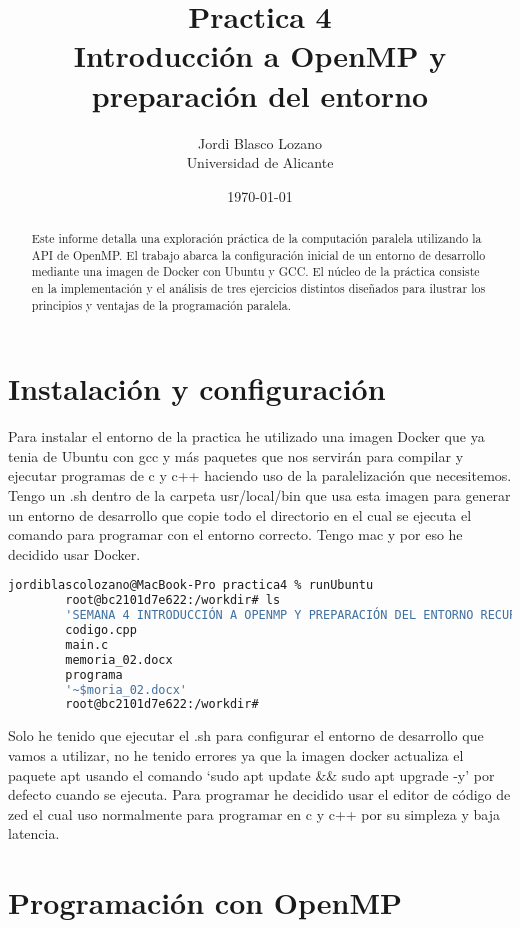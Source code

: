 \documentclass{article}
\title{Practica 4 \\ Introducción a OpenMP y preparación del entorno}
\author{
	Jordi Blasco Lozano \\
	\small Universidad de Alicante
}
\date{\today}
\begin{document}
	
	\maketitle
	
	\begin{abstract}
		\noindent Este informe detalla una exploración práctica de la computación paralela utilizando la API de OpenMP. El trabajo abarca la configuración inicial de un entorno de desarrollo mediante una imagen de Docker con Ubuntu y GCC. El núcleo de la práctica consiste en la implementación y el análisis de tres ejercicios distintos diseñados para ilustrar los principios y ventajas de la programación paralela.
	\end{abstract}
	
	\tableofcontents
	\newpage
	
	\section{Instalación y configuración}
	Para instalar el entorno de la practica he utilizado una imagen Docker que ya tenia de Ubuntu con gcc y más paquetes que nos servirán para compilar y ejecutar programas de c y c++ haciendo uso de la paralelización que necesitemos. Tengo un .sh dentro de la carpeta usr/local/bin que usa esta imagen para generar un entorno de desarrollo que copie todo el directorio en el cual se ejecuta el comando para programar con el entorno correcto. Tengo mac y por eso he decidido usar Docker.
	
	\begin{lstlisting}[style=consola, language=bash]
		jordiblascolozano@MacBook-Pro practica4 % runUbuntu
		root@bc2101d7e622:/workdir# ls
		'SEMANA 4 INTRODUCCIÓN A OPENMP Y PREPARACIÓN DEL ENTORNO RECUPERADO.pdf'
		codigo.cpp
		main.c
		memoria_02.docx
		programa
		'~$moria_02.docx'
		root@bc2101d7e622:/workdir# \end{lstlisting}
	
	\noindent Solo he tenido que ejecutar el .sh para configurar el entorno de desarrollo que vamos a utilizar, no he tenido errores ya que la imagen docker actualiza el paquete apt usando el comando ‘sudo apt update \&\& sudo apt upgrade -y’ por defecto cuando se ejecuta. Para programar he decidido usar el editor de código de zed el cual uso normalmente para programar en c y c++ por su simpleza y baja latencia.
	
	\section{Programación con OpenMP}
\end{document}
